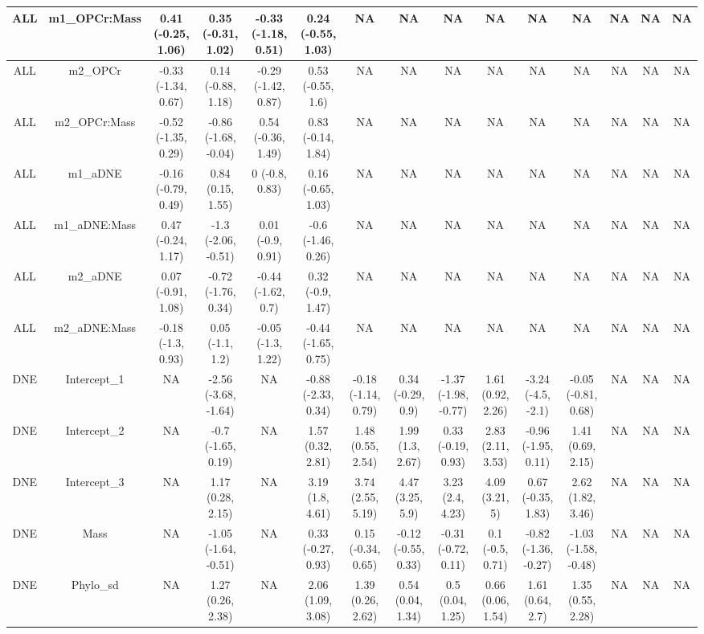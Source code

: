 \begin{longtable}[t]{c|c|c|c|c|c|c|c|c|c|c|c|c|c|c}
\hline
ALL & m1_OPCr:Mass & 0.41 (-0.25, 1.06) & 0.35 (-0.31, 1.02) & -0.33 (-1.18, 0.51) & 0.24 (-0.55, 1.03) & NA & NA & NA & NA & NA & NA & NA & NA & NA\\
\hline
ALL & m2_OPCr & -0.33 (-1.34, 0.67) & 0.14 (-0.88, 1.18) & -0.29 (-1.42, 0.87) & 0.53 (-0.55, 1.6) & NA & NA & NA & NA & NA & NA & NA & NA & NA\\
\hline
ALL & m2_OPCr:Mass & -0.52 (-1.35, 0.29) & -0.86 (-1.68, -0.04) & 0.54 (-0.36, 1.49) & 0.83 (-0.14, 1.84) & NA & NA & NA & NA & NA & NA & NA & NA & NA\\
\hline
ALL & m1_aDNE & -0.16 (-0.79, 0.49) & 0.84 (0.15, 1.55) & 0 (-0.8, 0.83) & 0.16 (-0.65, 1.03) & NA & NA & NA & NA & NA & NA & NA & NA & NA\\
\hline
ALL & m1_aDNE:Mass & 0.47 (-0.24, 1.17) & -1.3 (-2.06, -0.51) & 0.01 (-0.9, 0.91) & -0.6 (-1.46, 0.26) & NA & NA & NA & NA & NA & NA & NA & NA & NA\\
\hline
ALL & m2_aDNE & 0.07 (-0.91, 1.08) & -0.72 (-1.76, 0.34) & -0.44 (-1.62, 0.7) & 0.32 (-0.9, 1.47) & NA & NA & NA & NA & NA & NA & NA & NA & NA\\
\hline
ALL & m2_aDNE:Mass & -0.18 (-1.3, 0.93) & 0.05 (-1.1, 1.2) & -0.05 (-1.3, 1.22) & -0.44 (-1.65, 0.75) & NA & NA & NA & NA & NA & NA & NA & NA & NA\\
\hline
DNE & Intercept_1 & NA & -2.56 (-3.68, -1.64) & NA & -0.88 (-2.33, 0.34) & -0.18 (-1.14, 0.79) & 0.34 (-0.29, 0.9) & -1.37 (-1.98, -0.77) & 1.61 (0.92, 2.26) & -3.24 (-4.5, -2.1) & -0.05 (-0.81, 0.68) & NA & NA & NA\\
\hline
DNE & Intercept_2 & NA & -0.7 (-1.65, 0.19) & NA & 1.57 (0.32, 2.81) & 1.48 (0.55, 2.54) & 1.99 (1.3, 2.67) & 0.33 (-0.19, 0.93) & 2.83 (2.11, 3.53) & -0.96 (-1.95, 0.11) & 1.41 (0.69, 2.15) & NA & NA & NA\\
\hline
DNE & Intercept_3 & NA & 1.17 (0.28, 2.15) & NA & 3.19 (1.8, 4.61) & 3.74 (2.55, 5.19) & 4.47 (3.25, 5.9) & 3.23 (2.4, 4.23) & 4.09 (3.21, 5) & 0.67 (-0.35, 1.83) & 2.62 (1.82, 3.46) & NA & NA & NA\\
\hline
DNE & Mass & NA & -1.05 (-1.64, -0.51) & NA & 0.33 (-0.27, 0.93) & 0.15 (-0.34, 0.65) & -0.12 (-0.55, 0.33) & -0.31 (-0.72, 0.11) & 0.1 (-0.5, 0.71) & -0.82 (-1.36, -0.27) & -1.03 (-1.58, -0.48) & NA & NA & NA\\
\hline
DNE & Phylo_sd & NA & 1.27 (0.26, 2.38) & NA & 2.06 (1.09, 3.08) & 1.39 (0.26, 2.62) & 0.54 (0.04, 1.34) & 0.5 (0.04, 1.25) & 0.66 (0.06, 1.54) & 1.61 (0.64, 2.7) & 1.35 (0.55, 2.28) & NA & NA & NA\\

\end{longtable}
